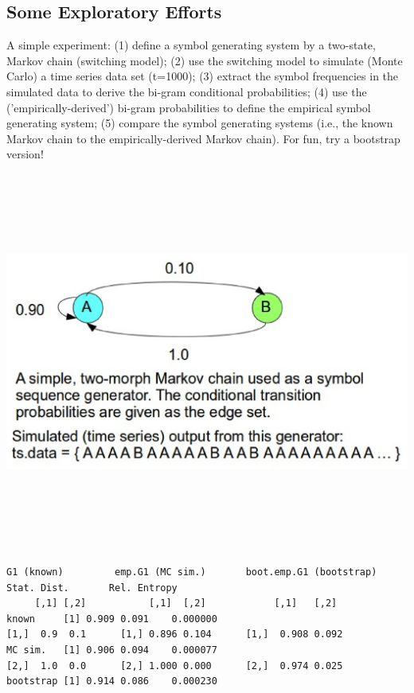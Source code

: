 \documentclass[noback]{psuposter}
\begin{document}
\subsection{Some Exploratory Efforts}
\vspace{-.5cm}
\small A simple experiment: (1) define a symbol generating system by a two-state, Markov chain (switching model); (2) use the switching model to simulate (Monte Carlo) a time series data set (t=1000); (3) extract the symbol frequencies in the simulated data to derive the bi-gram conditional probabilities; (4) use the ('empirically-derived') bi-gram probabilities to define the empirical symbol generating system; (5) compare the symbol generating systems (i.e., the known Markov chain to the empirically-derived Markov chain). For fun, try a bootstrap version!
\centerline{\includegraphics[height=12.5cm]{figs/Image6.eps}}
\vspace{-2cm}
{\scriptsize
\begin{verbatim}
G1 (known)         emp.G1 (MC sim.)       boot.emp.G1 (bootstrap)                Stat. Dist.       Rel. Entropy
     [,1] [,2]           [,1]  [,2]            [,1]   [,2]             known     [1] 0.909 0.091    0.000000
[1,]  0.9  0.1      [1,] 0.896 0.104      [1,]  0.908 0.092            MC sim.   [1] 0.906 0.094    0.000077
[2,]  1.0  0.0      [2,] 1.000 0.000      [2,]  0.974 0.025            bootstrap [1] 0.914 0.086    0.000230
\end{verbatim}
}
%
\end{document}
